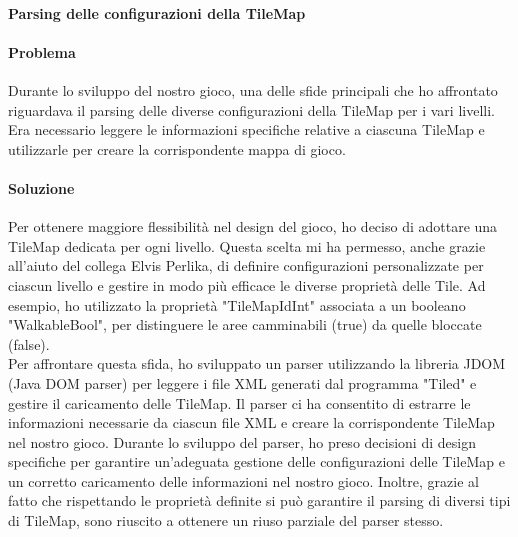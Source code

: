 \documentclass[a4paper,12pt]{report}
\begin{document}
\paragraph*{Parsing delle configurazioni della TileMap}
\paragraph{Problema}
Durante lo sviluppo del nostro gioco, una delle sfide principali che ho affrontato riguardava il parsing delle diverse configurazioni della TileMap per i vari livelli. 
Era necessario leggere le informazioni specifiche relative a ciascuna TileMap e utilizzarle per creare la corrispondente mappa di gioco.
\paragraph{Soluzione}
Per ottenere maggiore flessibilità nel design del gioco, ho deciso di adottare una TileMap dedicata per ogni livello. 
Questa scelta mi ha permesso, anche grazie all'aiuto del collega Elvis Perlika, di definire configurazioni personalizzate per ciascun livello e gestire in modo più efficace le diverse proprietà delle Tile.
Ad esempio, ho utilizzato la proprietà "TileMapIdInt" associata a un booleano "WalkableBool", per distinguere le aree camminabili (true) da quelle bloccate (false).
\\
Per affrontare questa sfida, ho sviluppato un parser utilizzando la libreria JDOM (Java DOM parser) per leggere i file XML generati dal programma "Tiled" e gestire il caricamento delle TileMap.
Il parser ci ha consentito di estrarre le informazioni necessarie da ciascun file XML e creare la corrispondente TileMap nel nostro gioco.
Durante lo sviluppo del parser, ho preso decisioni di design specifiche per garantire un'adeguata gestione delle configurazioni delle TileMap e un corretto caricamento delle informazioni nel nostro gioco.
Inoltre, grazie al fatto che rispettando le proprietà definite si può garantire il parsing di diversi tipi di TileMap, sono riuscito a ottenere un riuso parziale del parser stesso.
\end{document}
